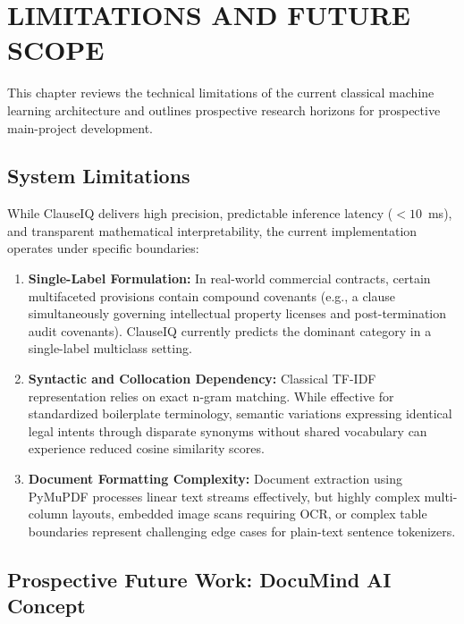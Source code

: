 \chapter{LIMITATIONS AND FUTURE SCOPE}
\label{ch:future_scope}

This chapter reviews the technical limitations of the current classical machine learning architecture and outlines prospective research horizons for prospective main-project development.

\section{System Limitations}
\label{sec:system_limitations}

While ClauseIQ delivers high precision, predictable inference latency ($<10$~ms), and transparent mathematical interpretability, the current implementation operates under specific boundaries:
\begin{enumerate}
    \item \textbf{Single-Label Formulation:} In real-world commercial contracts, certain multifaceted provisions contain compound covenants (e.g., a clause simultaneously governing intellectual property licenses and post-termination audit covenants). ClauseIQ currently predicts the dominant category in a single-label multiclass setting.
    \item \textbf{Syntactic and Collocation Dependency:} Classical TF-IDF representation relies on exact n-gram matching. While effective for standardized boilerplate terminology, semantic variations expressing identical legal intents through disparate synonyms without shared vocabulary can experience reduced cosine similarity scores.
    \item \textbf{Document Formatting Complexity:} Document extraction using PyMuPDF processes linear text streams effectively, but highly complex multi-column layouts, embedded image scans requiring OCR, or complex table boundaries represent challenging edge cases for plain-text sentence tokenizers.
\end{enumerate}

\section{Prospective Future Work: DocuMind AI Concept}
\label{sec:documind_future_scope}

